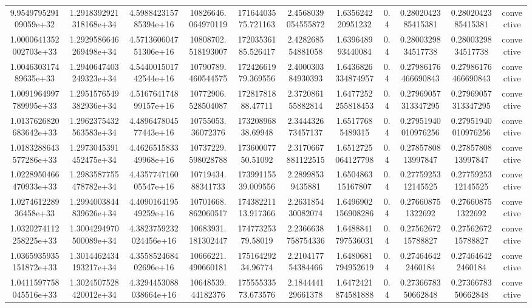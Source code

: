 \begin{table}
\begin{tabular}{ccccccccccc}
9.954979529109059e+32 & 1.2918392921318168e+34 & 4.598842315785394e+16 & 10826646.064970119 & 17164403575.721163 & 2.4568039054555872 & 1.635624220951232 & 0.4 & 0.2802042385415381 & 0.2802042385415381 & convective \\
1.0000641352002703e+33 & 1.2929586646269498e+34 & 4.571360604751306e+16 & 10808702.518193007 & 17203536185.526417 & 2.428268554881058 & 1.639648993440084 & 0.4 & 0.2800329834517738 & 0.2800329834517738 & convective \\
1.004630317489635e+33 & 1.2940647403249323e+34 & 4.544001501742544e+16 & 10790789.460544575 & 17242661979.369556 & 2.400030384930393 & 1.6436826334874957 & 0.4 & 0.27986176466690843 & 0.27986176466690843 & convective \\
1.0091964997789995e+33 & 1.2951576549382936e+34 & 4.516764174899157e+16 & 10772906.528504087 & 17281781888.47711 & 2.372086155882814 & 1.6477252255818453 & 0.4 & 0.27969057313347295 & 0.27969057313347295 & convective \\
1.0137626820683642e+33 & 1.2962375432563583e+34 & 4.489647804577443e+16 & 10755053.36072376 & 17320896838.69948 & 2.344432673457137 & 1.65177685489315 & 0.4 & 0.27951940010976256 & 0.27951940010976256 & convective \\
1.0183288643577286e+33 & 1.2973045391452475e+34 & 4.462651583349968e+16 & 10737229.598028788 & 17360007750.51092 & 2.3170667881122515 & 1.6512725064127798 & 0.4 & 0.2785780813997847 & 0.2785780813997847 & convective \\
1.0228950466470933e+33 & 1.2983587755478782e+34 & 4.435774716005547e+16 & 10719434.88341733 & 17399115539.009556 & 2.28998539435881 & 1.650486315167807 & 0.4 & 0.2775925312145525 & 0.2775925312145525 & convective \\
1.027461228936458e+33 & 1.2994003844839626e+34 & 4.409016419549259e+16 & 10701668.862060517 & 17438221113.917366 & 2.263185430082074 & 1.6496902156908286 & 0.4 & 0.276608751322692 & 0.276608751322692 & convective \\
1.0320274112258225e+33 & 1.3004294970500089e+34 & 4.3823759232024456e+16 & 10683931.181302447 & 17477325379.58019 & 2.2366638758754336 & 1.6488841797536031 & 0.4 & 0.2756267215788827 & 0.2756267215788827 & convective \\
1.0365935935151872e+33 & 1.3014462434193217e+34 & 4.355852468402696e+16 & 10666221.490660181 & 17516429234.96774 & 2.210417754384466 & 1.6480681794952619 & 0.4 & 0.274646422460184 & 0.274646422460184 & convective \\
1.0411597758045516e+33 & 1.3024507528420012e+34 & 4.3294453088038664e+16 & 10648539.44182376 & 17555533573.673576 & 2.184444129661378 & 1.6472421874581888 & 0.4 & 0.2736678350662848 & 0.2736678350662848 & convective \\

\end{tabular}
\end{table}
